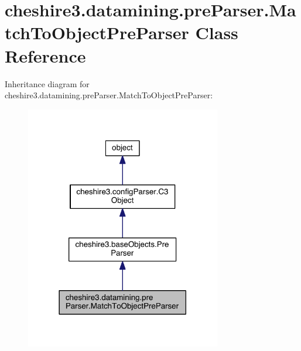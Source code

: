 \hypertarget{classcheshire3_1_1datamining_1_1pre_parser_1_1_match_to_object_pre_parser}{\section{cheshire3.\-datamining.\-pre\-Parser.\-Match\-To\-Object\-Pre\-Parser Class Reference}
\label{classcheshire3_1_1datamining_1_1pre_parser_1_1_match_to_object_pre_parser}
}


Inheritance diagram for cheshire3.\-datamining.\-pre\-Parser.\-Match\-To\-Object\-Pre\-Parser\-:
\nopagebreak
\begin{figure}[H]
\begin{center}
\leavevmode
\includegraphics[width=242pt]{classcheshire3_1_1datamining_1_1pre_parser_1_1_match_to_object_pre_parser__inherit__graph}
\end{center}
\end{figure}


